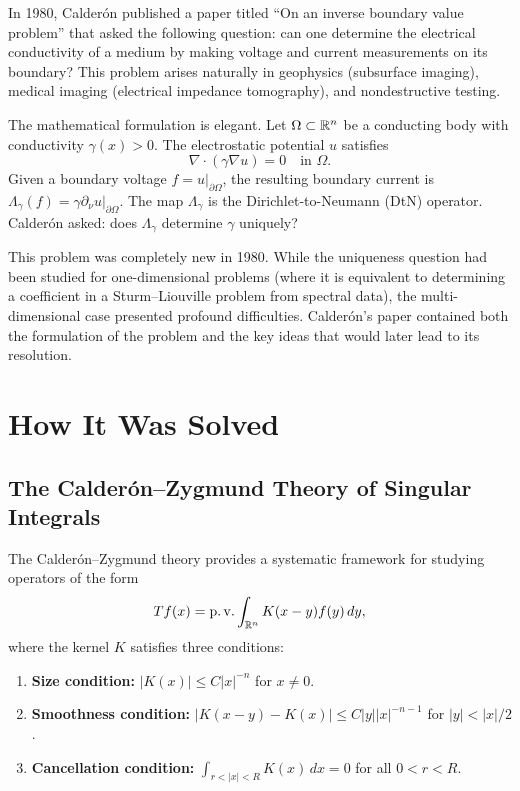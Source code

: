 In 1980, Calder\'{o}n published a paper titled ``On an inverse boundary value problem'' that asked the following question: can one determine the electrical conductivity of a medium by making voltage and current measurements on its boundary? This problem arises naturally in geophysics (subsurface imaging), medical imaging (electrical impedance tomography), and nondestructive testing.

The mathematical formulation is elegant. Let $\Omega \subset \mathbb{R}^n$ be a conducting body with conductivity $\gamma(x) > 0$. The electrostatic potential $u$ satisfies
\[
\nabla \cdot (\gamma \nabla u) = 0 \quad \text{in } \Omega.
\]
Given a boundary voltage $f = u|_{\partial\Omega}$, the resulting boundary current is $\Lambda_\gamma(f) = \gamma \partial_\nu u|_{\partial\Omega}$. The map $\Lambda_\gamma$ is the Dirichlet-to-Neumann (DtN) operator. Calder\'{o}n asked: does $\Lambda_\gamma$ determine $\gamma$ uniquely?

This problem was completely new in 1980. While the uniqueness question had been studied for one-dimensional problems (where it is equivalent to determining a coefficient in a Sturm--Liouville problem from spectral data), the multi-dimensional case presented profound difficulties. Calder\'{o}n's paper contained both the formulation of the problem and the key ideas that would later lead to its resolution.

\section{How It Was Solved}

\subsection{The Calder\'{o}n--Zygmund Theory of Singular Integrals}

The Calder\'{o}n--Zygmund theory provides a systematic framework for studying operators of the form
\[
Tf(x) = \operatorname{p.v.} \int_{\mathbb{R}^n} K(x-y) f(y) \,dy,
\]
where the kernel $K$ satisfies three conditions:
\begin{enumerate}
    \item \textbf{Size condition:} $|K(x)| \leq C |x|^{-n}$ for $x \neq 0$.
    \item \textbf{Smoothness condition:} $|K(x-y) - K(x)| \leq C |y| |x|^{-n-1}$ for $|y| < |x|/2$.
    \item \textbf{Cancellation condition:} $\int_{r < |x| < R} K(x) \,dx = 0$ for all $0 < r < R$.
\end{enumerate}


